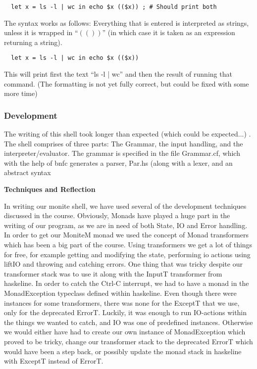 \documentclass[11pt,a4paper]{article}
\begin{document}
\begin{verbatim}
  let x = ls -l | wc in echo $x (($x)) ; # Should print both
\end{verbatim}




The syntax works as follows: Everything that is entered is interpreted as
strings, unless it is wrapped in ``$\left( \left(  \right) \right)$'' (in which
case it is taken as an expression returning a string).

\begin{verbatim}
  let x = ls -l | wc in echo $x (($x))
\end{verbatim}

This will print first the text ``ls -l | wc'' and then the result of running
that command. (The formatting is not yet fully correct, but could be fixed with
some more time)

\subsubsection{Development}

The writing of this shell took longer than expected (which could be expected...)
. The shell comprises of three parts: The Grammar, the input handling, and the
interpreter/evaluator. The grammar is specified in the file Grammar.cf, which
with the help of bnfc generates a parser, Par.hs (along with a lexer, and an
abstract syntax

\textbf{Techniques and Reflection}

In writing our monite shell, we have used several of the development techniques
discussed in the course. Obviously, Monads have played a huge part in the
writing of our program, as we are in need of both State, IO and Error handling.
In order to get our MoniteM monad we used the concept of Monad transformers
which has been a big part of the course. Using transformers we get a lot of
things for free, for example getting and modifying the state, performing io
actions using liftIO and throwing and catching errors. One thing that was
tricky despite our transformer stack was to use it along with the InputT
transformer from haskeline. In order to catch the Ctrl-C interrupt, we had to
have a monad in the MonadException typeclass defined within haskeline. Even
though there were instances for some transformers, there was none for the
ExceptT that we use, only for the deprecated ErrorT. Luckily, it was enough to
run IO-actions within the things we wanted to catch, and IO was one of
predefined instances. Otherwise we would either have had to create our own
instance of MonadException which proved to be tricky, change our transformer
stack to the deprecated ErrorT which would have been a step back, or possibly
update the monad stack in haskeline with ExceptT instead of ErrorT.
\end{document}
